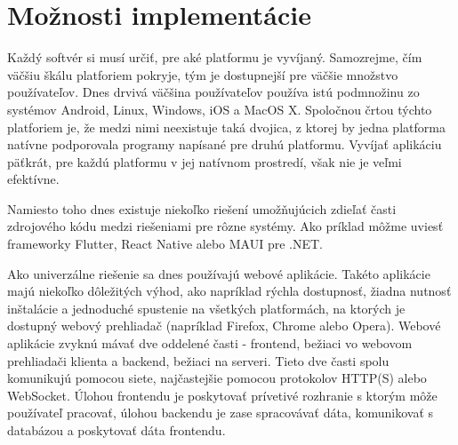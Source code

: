 \chapter{Možnosti implementácie}

\label{kap:moznosti_implementacie}

Každý softvér si musí určiť, pre aké platformu je vyvíjaný. Samozrejme, čím väčšiu škálu platforiem pokryje,
tým je dostupnejší pre väčšie množstvo používateľov. Dnes drvivá väčšina používateľov používa istú podmnožinu
zo systémov Android, Linux, Windows, iOS a MacOS X. Spoločnou črtou týchto platforiem je, že medzi nimi neexistuje taká dvojica,
z ktorej by jedna platforma natívne podporovala programy napísané pre druhú platformu. Vyvíjať aplikáciu päťkrát,
pre každú platformu v jej natívnom prostredí, však nie je veľmi efektívne. 

Namiesto toho dnes existuje niekoľko riešení umožňujúcich zdieľať časti zdrojového kódu medzi riešeniami pre rôzne systémy.
Ako príklad môžme uviesť frameworky Flutter, React Native alebo MAUI pre .NET.

Ako univerzálne riešenie sa dnes používajú webové aplikácie.
Takéto aplikácie majú niekoľko dôležitých výhod, ako napríklad rýchla dostupnosť, žiadna nutnosť inštalácie a jednoduché spustenie
na všetkých platformách, na ktorých je dostupný webový prehliadač (napríklad Firefox, Chrome alebo Opera).
Webové aplikácie zvyknú mávať dve oddelené časti - frontend, bežiaci vo webovom prehliadači klienta a backend,
bežiaci na serveri. Tieto dve časti spolu komunikujú pomocou siete, najčastejšie pomocou protokolov HTTP(S) alebo WebSocket.
Úlohou frontendu je poskytovať prívetivé rozhranie s ktorým môže používateľ pracovať, úlohou backendu je zase spracovávať dáta,
komunikovať s databázou a poskytovať dáta frontendu. 
